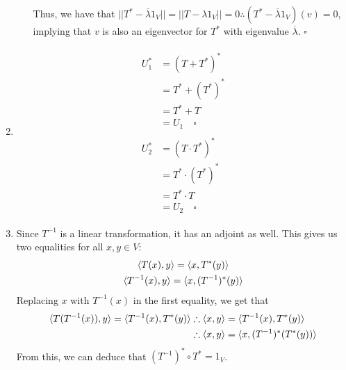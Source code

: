 \documentclass[12pt]{article}
\begin{document}
\begin{enumerate}
\begin{enumerate}
                        Thus, we have that
                        $||T^*-\overline{\lambda} \mathrm{1}_V||=||T-\lambda\mathrm{1}_V||=0 \therefore (T^*-\overline{\lambda} \mathrm{1}_V)(v)=0$,
                        implying that $v$ is also an eigenvector for $T^*$ with eigenvalue $\overline{\lambda}$. $\square$
            \end{enumerate}
      \item \begin{gather*}
                  \begin{aligned}
                        U_1^* & = (T+T^*)^*       \\
                              & = T^*+(T^*)^*     \\
                              & = T^*+T           \\
                              & = U_1\quad\square
                  \end{aligned} \\
                  \begin{aligned}
                        U_2^* & = (T \cdot T^*)^*   \\
                              & = T^* \cdot (T^*)^* \\
                              & = T^* \cdot T       \\
                              & = U_2\quad\square
                  \end{aligned}
            \end{gather*}
      \item Since $T^{-1}$ is a linear transformation, it has an adjoint as well.
            This gives us two equalities for all $x, y \in V$:
            \begin{gather*}
                  \braket{T(x), y}=\braket{x, T^*(y)} \\
                  \braket{T^{-1}(x), y}=\braket{x, (T^{-1})^*(y)}
            \end{gather*}
            Replacing $x$ with $T^{-1}(x)$ in the first equality, we get that
            \begin{align*}
                  \braket{T(T^{-1}(x)), y}=\braket{T^{-1}(x), T^*(y)} & \therefore \braket{x, y}=\braket{T^{-1}(x), T^*(y)}     \\
                                                                      & \therefore \braket{x, y}=\braket{x, (T^{-1})^*(T^*(y))}
            \end{align*}
            From this, we can deduce that $(T^{-1})^* \circ T^* = \mathrm{1}_V$.


\end{enumerate}
\end{document}
